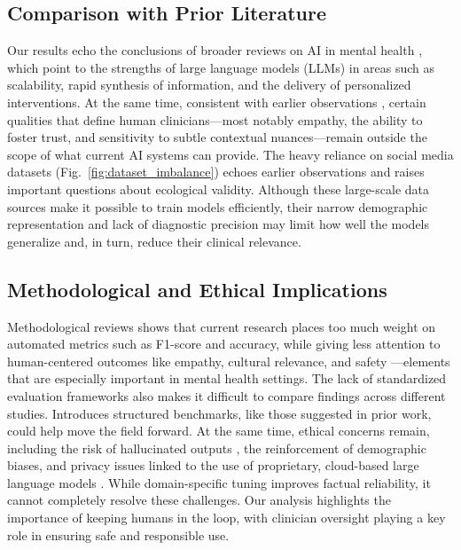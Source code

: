 \documentclass[sn-basic,authoryear]{sn-jnl}
\begin{document}
\subsection{Comparison with Prior Literature}
Our results echo the conclusions of broader reviews on AI in mental health \citep{JMIR2024, Ibrahimov2024} , which point to the strengths of large language models (LLMs) in areas such as scalability, rapid synthesis of information, and the delivery of personalized interventions. At the same time, consistent with earlier observations \citep{Minerva2023} , certain qualities that define human clinicians—most notably empathy, the ability to foster trust, and sensitivity to subtle contextual nuances—remain outside the scope of what current AI systems can provide. The heavy reliance on social media datasets (Fig.~\ref{fig:dataset_imbalance}) echoes earlier observations \citep{Hua2024b} and raises important questions about ecological validity. Although these large-scale data sources make it possible to train models efficiently, their narrow demographic representation and lack of diagnostic precision may limit how well the models generalize and, in turn, reduce their clinical relevance.

\subsection{Methodological and Ethical Implications}
Methodological reviews shows that current research places too much weight on automated metrics such as F1-score and accuracy, while giving less attention to human-centered outcomes like empathy, cultural relevance, and safety \citep{Hua2024b}—elements that are especially important in mental health settings. The lack of standardized evaluation frameworks also makes it difficult to compare findings across different studies. Introduces structured benchmarks, like those suggested in prior work, could help move the field forward. At the same time, ethical concerns remain, including the risk of hallucinated outputs \citep{Hu2025}, the reinforcement of demographic biases, and privacy issues linked to the use of proprietary, cloud-based large language models \citep{Minerva2023} . While domain-specific tuning improves factual reliability, it cannot completely resolve these challenges. Our analysis highlights the importance of keeping humans in the loop, with clinician oversight playing a key role in ensuring safe and responsible use.
\end{document}
